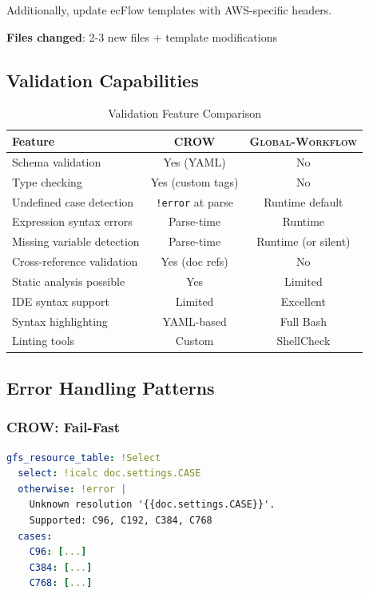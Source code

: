 \documentclass[11pt,twoside]{article}
\newcommand{\crow}{\textsc{CROW}}
\newcommand{\gw}{\textsc{Global-Workflow}}
\begin{document}
Additionally, update ecFlow templates with AWS-specific headers.

\textbf{Files changed}: 2-3 new files + template modifications

\subsection{Validation Capabilities}

\begin{table}[H]
\centering
\caption{Validation Feature Comparison}
\label{tab:validation}
\begin{tabular}{@{}lcc@{}}
\toprule
\textbf{Feature} & \textbf{\crow{}} & \textbf{\gw{}} \\
\midrule
Schema validation & Yes (YAML) & No \\
Type checking & Yes (custom tags) & No \\
Undefined case detection & \texttt{!error} at parse & Runtime default \\
Expression syntax errors & Parse-time & Runtime \\
Missing variable detection & Parse-time & Runtime (or silent) \\
Cross-reference validation & Yes (doc refs) & No \\
Static analysis possible & Yes & Limited \\
IDE syntax support & Limited & Excellent \\
Syntax highlighting & YAML-based & Full Bash \\
Linting tools & Custom & ShellCheck \\
\bottomrule
\end{tabular}
\end{table}

\subsection{Error Handling Patterns}

\subsubsection{CROW: Fail-Fast}

\begin{lstlisting}[language=YAML, caption={\crow{} Error Handling}]
gfs_resource_table: !Select
  select: !icalc doc.settings.CASE
  otherwise: !error |
    Unknown resolution '{{doc.settings.CASE}}'.
    Supported: C96, C192, C384, C768
  cases:
    C96: [...]
    C384: [...]
    C768: [...]
\end{lstlisting}
\end{document}
